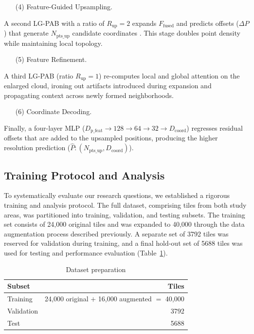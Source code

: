 \documentclass[remotesensing,article,accept,pdftex,moreauthors]{Definitions/mdpi}
\begin{document}
\begin{enumerate}
\item[(4)] {Feature-Guided Upsampling.}
\end{enumerate}

A second LG-PAB with a ratio of $R_{\text{up}}=2$ expands $F_{\text{fused}}$ and predicts offsets ($\Delta P$) that generate $N_{\text{pts\_up}}$ candidate coordinates%
. This stage doubles point density while maintaining local topology.

\begin{enumerate}
\item[(5)] {Feature Refinement.}
\end{enumerate}

A third LG-PAB (ratio $R_{\text{up}}=1$) re-computes local and global attention on the enlarged cloud, ironing out artifacts introduced during expansion and propagating context across newly formed neighborhoods.

\begin{enumerate}
\item[(6)] {Coordinate Decoding.}
\end{enumerate}

Finally, a four-layer MLP ($D_{\text{p\_feat}} \rightarrow 128 \rightarrow 64 \rightarrow 32 \rightarrow D_{\text{coord}}$) regresses residual offsets that are added to the upsampled positions, producing the higher resolution prediction ($\hat{P}: (N_{\text{pts\_up}}, D_{\text{coord}})$).

\subsection{Training Protocol and Analysis}
\label{sec:study_design}
To systematically evaluate our research questions, we established a rigorous training and analysis protocol. The full dataset, comprising tiles from both study areas, was partitioned into training, validation, and testing subsets. The training set consists of 24,000 original tiles and was expanded to 40,000 through the data augmentation process described previously. A separate set of 3792 tiles was reserved for validation during training, and a final hold-out set of 5688 tiles was used for testing and performance evaluation \mbox{(Table \ref{tab:data_prep})}.
\begin{table}[htbp]
  \centering
  \caption{Dataset preparation}
  \label{tab:data_prep}
  \begin{tabular}{lr}
    \toprule
    \textbf{Subset} & \textbf{Tiles} \\
    \midrule
    Training        & 24,000 original $+$ 16,000 augmented $=$ 40,000 \\
    Validation      & 3792 \\
    Test            & 5688 \\
    \bottomrule
  \end{tabular}
\end{table}
\end{document}
